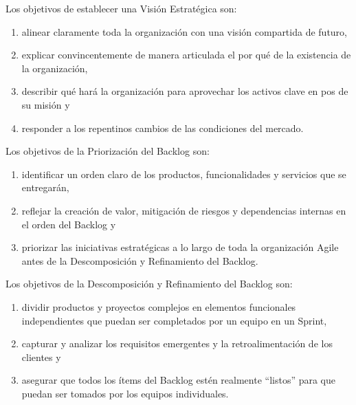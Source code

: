 \documentclass{article} %
\begin{document}
\noindent 

\noindent Los objetivos de establecer una Visi\'{o}n Estrat\'{e}gica son:

\begin{enumerate}
\item  alinear claramente toda la organizaci\'{o}n con una visi\'{o}n compartida de futuro,

\item  explicar convincentemente de manera articulada el por qu\'{e} de la existencia de la organizaci\'{o}n,

\item  describir qu\'{e} har\'{a} la organizaci\'{o}n para aprovechar los activos clave en pos de su misi\'{o}n y

\item  responder a los repentinos cambios de las condiciones del mercado.
\end{enumerate}

\noindent 

\noindent Los objetivos de la Priorizaci\'{o}n del Backlog son:

\begin{enumerate}
\item  identificar un orden claro de los productos, funcionalidades y servicios que se entregar\'{a}n,

\item  reflejar la creaci\'{o}n de valor, mitigaci\'{o}n de riesgos y dependencias internas en el orden del Backlog y

\item  priorizar las iniciativas estrat\'{e}gicas a lo largo de toda la organizaci\'{o}n Agile antes de la Descomposici\'{o}n y Refinamiento del Backlog.
\end{enumerate}

\noindent 

\noindent Los objetivos de la Descomposici\'{o}n y Refinamiento del Backlog son:

\begin{enumerate}
\item  dividir productos y proyectos complejos en elementos funcionales independientes que puedan ser completados por un equipo en un Sprint,

\item  capturar y analizar los requisitos emergentes y la retroalimentaci\'{o}n de los clientes y

\item  asegurar que todos los \'{i}tems del Backlog {}{}est\'{e}n realmente ``listos'' para que puedan ser tomados por los equipos individuales.
\end{enumerate}
\end{document}
